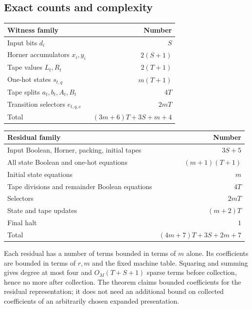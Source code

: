 \documentclass[11pt,letterpaper]{article}
\numberwithin{equation}{section}
\theoremstyle{definition}
\theoremstyle{remark}
\begin{document}
\subsection{Exact counts and complexity}
\begin{center}
\begin{tabular}{@{}lr@{}}
\toprule
Witness family & Number\\
\midrule
Input bits $d_i$ & $S$\\
Horner accumulators $x_i,y_i$ & $2(S+1)$\\
Tape values $L_t,R_t$ & $2(T+1)$\\
One-hot states $s_{t,q}$ & $m(T+1)$\\
Tape splits $a_t,b_t,A_t,B_t$ & $4T$\\
Transition selectors $e_{t,q,c}$ & $2mT$\\
\midrule
Total & $(3m+6)T+3S+m+4$\\
\bottomrule
\end{tabular}
\end{center}

\begin{center}
\begin{tabular}{@{}lr@{}}
\toprule
Residual family & Number\\
\midrule
Input Boolean, Horner, packing, initial tapes & $3S+5$\\
All state Boolean and one-hot equations & $(m+1)(T+1)$\\
Initial state equations & $m$\\
Tape divisions and remainder Boolean equations & $4T$\\
Selectors & $2mT$\\
State and tape updates & $(m+2)T$\\
Final halt & $1$\\
\midrule
Total & $(4m+7)T+3S+2m+7$\\
\bottomrule
\end{tabular}
\end{center}

Each residual has a number of terms bounded in terms of $m$ alone. Its
coefficients are bounded in terms of $r,m$ and the fixed machine table.
Squaring and summing gives degree at most four and
$O_M(T+S+1)$ sparse terms before collection, hence no more after collection.
The theorem claims bounded coefficients for the residual representation;
it does not need an additional bound on collected coefficients of an
arbitrarily chosen expanded presentation.
\end{document}
